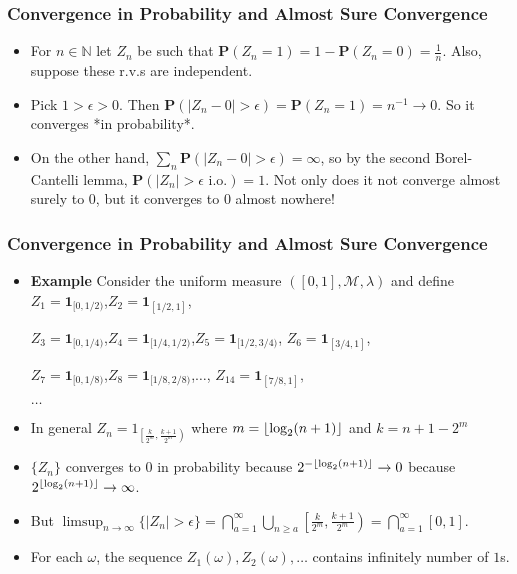 \documentclass[handout]{beamer}
\DeclarePairedDelimiter\floor{\lfloor}{\rfloor}
\newcommand{\BP}{\mathbf{P}}
\newcommand{\BI}{\mathbf{1}}
\begin{document}
\frame
{
  \frametitle{Convergence in Probability and Almost Sure Convergence}

   \begin{itemize}
     
\item<2-> For $n \in \mathbb{N}$ let $Z_n$ be such that $\BP(Z_n = 1) = 1 - \BP(Z_n = 0) = \frac{1}{n}.$ Also, suppose these r.v.s are independent. 
   
\item<3-> Pick $1 > \epsilon > 0$. Then $\BP(|Z_n - 0| > \epsilon) = \BP(Z_n = 1) = n^{-1} \to 0$. So it converges *in probability*.

\item<3-> On the other hand, $\sum_n \BP(|Z_n - 0| > \epsilon) = \infty$, so by the second Borel-Cantelli lemma, $\BP(|Z_n| > \epsilon \text{ i.o.} ) = 1$. Not only does it not converge almost surely to $0$, but it converges to $0$ almost nowhere!
                                      
\end{itemize}
}

\frame
{
  \frametitle{Convergence in Probability and Almost Sure Convergence}

   \begin{itemize}
     
   \item<2-> \textbf{Example} Consider the uniform measure $([0,1],\mathcal{M}, \lambda)$ and define 
      $Z_1=\BI_{[0,1/2)}$,$Z_2=\BI_{[1/2,1]}$, 
      
      $Z_3=\BI_{[0,1/4)}$,$Z_4=\BI_{[1/4,1/2)}$,$Z_5=\BI_{[1/2,3/4)}$, $Z_6=\BI_{[3/4,1]}$,
      
      $Z_7=\BI_{[0,1/8)}$,$Z_8=\BI_{[1/8,2/8)}$,$\ldots$, $Z_{14}=\BI_{[7/8,1]},$
      
      $\ldots $
      
    \item<3->[-] In general $Z_n = 1_{\left[\frac{k}{2^m}, \frac{k+1}{2^m} \right)}$ where $m = \floor{\log_2(n + 1)}$ and $k = n + 1 - 2^m$
      
    \item<3->[-] $\{Z_n\}$ converges to $0$ in probability because $2^{- \floor{\log_2(n + 1)}} \to 0$ because $2^{ \floor{\log_2(n + 1)}} \to \infty$.
    
    \item<4->[-] But $\limsup_{n \to \infty} \{|Z_n| > \epsilon\} = \bigcap_{a=1}^ \infty \bigcup_{n \ge a} \left[\frac{k}{2^m}, \frac{k+1}{2^m} \right) = \bigcap_{a=1}^ \infty [0,1]$.
    
    
    
    \item<5->[-] For each $\omega$, the sequence $Z_1(\omega), Z_2(\omega),\ldots$ contains infinitely number of $1$s. 
      
      
          
                                      
\end{itemize}
}
\end{document}
